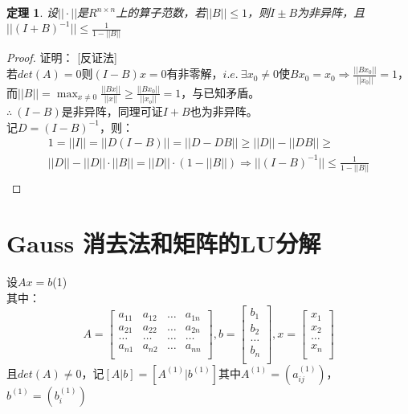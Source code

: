 \documentclass[a4paper]{article}
\newtheorem{theorem}{定理}[section]
\begin{document}
\begin{theorem}
\label{theorem_43}
设$||\cdot||$是$R^{n\times n}$上的算子范数，若$||B||\le 1$，则$I \pm B$为非异阵，且$||(I+B)^{-1}||\le \frac{1}{1-||B||}$
\end{theorem}

\begin{proof}
证明： [反证法]\\
若$det(A)=0$则$(I-B)x=0$有非零解，$i.e. \ \exists x_0 \neq 0 {\text{使}} Bx_0 = x_0 \Rightarrow \frac{||Bx_0||}{||x_0||}=1$，而$||B||=\max_{x\neq 0}\frac{||Bx||}{||x||}\ge \frac{||Bx_0||}{||x_o||}=1$，与已知矛盾。\\
$\therefore \ (I-B)$是非异阵，同理可证$I+B$也为非异阵。\\
记$D=(I-B)^{-1}$，则：
$$
\begin{array}{lr}
1 = ||I|| = ||D(I-B)|| = ||D-DB||\ge ||D|| - ||DB|| \ge \\ 
||D|| - ||D||\cdot ||B|| = ||D||\cdot(1-||B||) \Rightarrow ||(I-B)^{-1}|| \le \frac{1}{1-||B||} \\
\end{array}$$
\end{proof}

\section{Gauss 消去法和矩阵的LU分解}
设$Ax=b$\hfill (1)\\
其中：
$$A=\left[
\begin{matrix}
a_{11} & a_{12} & \dots & a_{1n} \\
a_{21} & a_{22} & \dots & a_{2n} \\ 
\dots & \dots & \dots & \dots \\
a_{n1} & a_{n2} & \dots & a_{nn} \\
\end{matrix} \right],
b = \left[ 
\begin{matrix}
b_1 \\ b_2 \\ \dots \\ b_n \\
\end{matrix}
\right],
x = \left[ 
\begin{matrix}
x_1 \\ x_2 \\ \dots \\ x_n \\
\end{matrix}
\right]
$$
且$det(A) \neq 0$，记$[A|b] = [A^{(1)}|b^{(1)}]$其中$A^{(1)} = (a_{ij}^{(1)})$，$b^{(1)}=(b_{i}^{(1)})$
\end{document}
